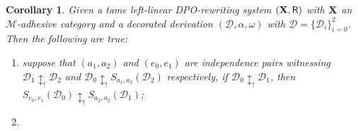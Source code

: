 \documentclass[a4paper]{article}
\def\R{\mathsf{R}}
\def\X{\textbf {\textup{X}}}
\newcommand{\dder}[1]{\mathscr{#1}}
\newcommand{\der}[1]{\underline{\dder{#1}}}
\newtheorem{corollary}[theorem]{Corollary}
\theoremstyle{definition}
\begin{document}
\iffalse 
\begin{corollary} Given a tame  left-linear DPO-rewriting system  $(\X,\R)$ with $\X$ an $\mathcal{M}$-adhesive category and a decorated derivation $(\der{D}, \alpha, \omega)$ with $\der{D}=\{\dder{D}_i\}_{i=0}^2$. Then the following are true: 
	\begin{enumerate}
		\item suppose that $(a_1,a_2)$ and $(e_0,e_1)$ are independence pairs witnessing  $\dder{D}_1\updownarrow_! \dder{D}_2$ and $\dder{D}_0\updownarrow_! S_{a_1,a_2}(\dder{D}_2)$ respectively, if $\dder{D}_0\updownarrow_!\dder{D}_1$, then $S_{e_0,e_1}(\dder{D}_0)\updownarrow_!S_{a_2,a_2}(\dder{D}_1)$;
		\item 
	\end{enumerate}
\end{corollary}
\end{document}

